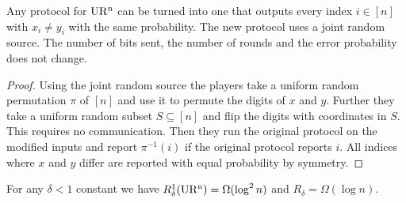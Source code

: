 \begin{lemma}\label{aver} Any protocol for $\operatorname{UR^n}$ can be turned into one that
outputs every index $i\in[n]$ with $x_i\ne y_i$ with the same probability. The
new protocol uses a joint random source. The number of bits sent, the number
of rounds and the error probability does not change.
\end{lemma}
\begin{proof}
Using the joint random source the players take a uniform 
random permutation $\pi$ of $[n]$ and use it to permute the digits of $x$ and
  $y$. Further they take a uniform random subset $S\subseteq[n]$ and flip the
  digits with coordinates in $S$. This requires no communication. 
Then they run the original protocol on the modified inputs and report
$\pi^{-1}(i)$ if the original protocol reports $i$. 
All indices where $x$ and $y$ differ are reported with equal probability by
symmetry.
\end{proof}

\begin{theorem}\label{thm:urlb}
For any $\delta<1$ constant we have $R^1_\delta(\operatorname{UR^n})=\Omega(\log^2 n)$ and
$R_\delta=\Omega(\log n)$.
\end{theorem}

